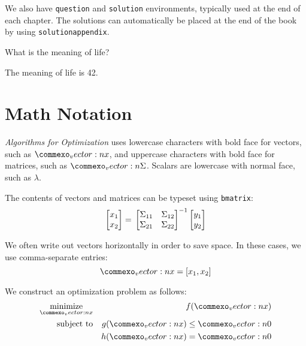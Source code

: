 We also have \texttt{question} and \texttt{solution} environments, typically used at the end of each chapter.
The solutions can automatically be placed at the end of the book by using \texttt{solutionappendix}.

\begin{question}
	What is the meaning of life?
\end{question}
\begin{solution}
	The meaning of life is \num{42}.
\end{solution}

\section{Math Notation}

\textit{Algorithms for Optimization} uses lowercase characters with bold face for vectors, such as $\vect x$, and uppercase characters with bold face for matrices, such as $\mat \Sigma$.
Scalars are lowercase with normal face, such as $\lambda$.

The contents of vectors and matrices can be typeset using \texttt{bmatrix}:
\begin{equation}
	\begin{bmatrix}x_1 \\ x_2\end{bmatrix} = \\
	\begin{bmatrix}
		\Sigma_{11} & \Sigma_{12} \\
		\Sigma_{21} & \Sigma_{22}
	\end{bmatrix}^{-1}
	\begin{bmatrix}y_1 \\ y_2\end{bmatrix}
\end{equation}

We often write out vectors horizontally in order to save space.
In these cases, we use comma-separate entries:
\begin{equation}
	\vect x = [x_1, x_2]
\end{equation}

We construct an optimization problem as follows:
\begin{equation}
	\begin{aligned}
        \minimize_{\vect x} & & f(\vect x)\\
        \subjectto & & g(\vect x) \leq \vect 0 \\
        		   & & h(\vect x) = \vect 0
    \end{aligned}
\end{equation}

